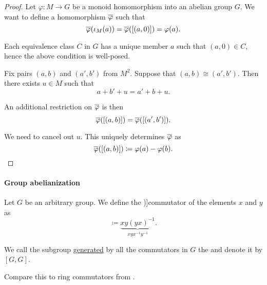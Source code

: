 \begin{proof}
  Let \( \varphi: M \to G \) be a monoid homomorphism into an abelian group \( G \). We want to define a homomorphism \( \oline{\varphi} \) such that
  \begin{equation*}
    \oline{\varphi}(\iota_M(a)) = \oline{\varphi}([(a, 0)]) = \varphi(a).
  \end{equation*}

  Each equivalence class \( C \) in \( G \) has a unique member \( a \) such that \( (a, 0) \in C \), hence the above condition is well-posed.

  Fix pairs \( (a, b) \) and \( (a', b') \) from \( M^2 \). Suppose that \( (a, b) \cong (a', b') \). Then there exists \( u \in M \) such that
  \begin{equation*}
    a + b' + u = a' + b + u.
  \end{equation*}

  An additional restriction on \( \oline{\varphi} \) is then
  \begin{equation*}
    \oline{\varphi}([(a, b)])
    =
    \oline{\varphi}([(a', b')]).
  \end{equation*}

  We need to cancel out \( u \). This uniquely determines \( \oline{\varphi} \) as
  \begin{equation*}
    \oline{\varphi}([(a, b)]) \coloneqq \varphi(a) - \varphi(b).
  \end{equation*}
\end{proof}

\paragraph{Group abelianization}

\begin{definition}\label{def:group_commutator}
  Let \( G \) be an arbitrary group. We define the \term[ru=коммутант (\cite[104]{Мальцев1970ОбщаяАлгебра})]{commutator} of the elements \( x \) and \( y \) as
  \begin{equation*}
    [x, y] \coloneqq \underbrace{xy(yx)^{-1}}_{xyx^{-1}y^{-1}}.
  \end{equation*}

  We call the subgroup \hyperref[def:group/submodel]{generated} by all the commutators in \( G \) the  and denote it by \( [G, G] \).
\end{definition}
\begin{comments}
  \item Compare this to ring commutators from .
\end{comments}

